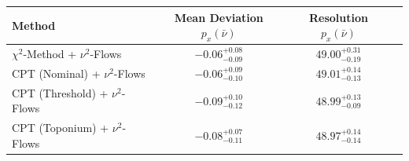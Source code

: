     \begin{tabular}{lccc}
        \toprule
        Method & Mean Deviation $p_{x}(\bar{\nu})$ & Resolution $p_{x}(\bar{\nu})$ \\
        \midrule
        $\chi^2$-Method + $\nu^2$-Flows & $-0.06^{+0.08}_{-0.09}$ & $49.00^{+0.31}_{-0.19}$ \\
        CPT (Nominal) + $\nu^2$-Flows & $-0.06^{+0.09}_{-0.10}$ & $49.01^{+0.14}_{-0.13}$ \\
        CPT (Threshold) + $\nu^2$-Flows & $-0.09^{+0.10}_{-0.12}$ & $48.99^{+0.13}_{-0.09}$ \\
        CPT (Toponium) + $\nu^2$-Flows & $-0.08^{+0.07}_{-0.11}$ & $48.97^{+0.14}_{-0.14}$ \\
        \bottomrule
    \end{tabular}